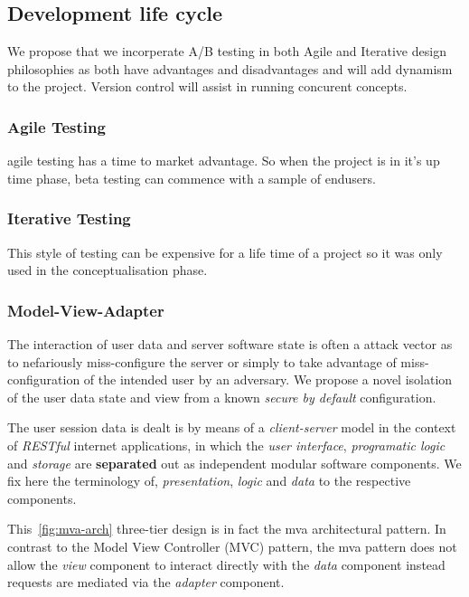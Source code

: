 \documentclass[letterpaper,twoside,12pt]{article}
\begin{document}
\subsection{Development life cycle}

We propose that we incorperate A/B testing in both Agile and Iterative design philosophies as both have advantages and disadvantages and will add dynamism to the project. Version control will assist in running concurent concepts. 

\subsubsection{Agile Testing}

\Gls{agile} testing has a time to market advantage. So when the project is in it's up time phase, beta testing can commence with a sample of endusers.

\subsubsection{Iterative Testing}

This style of testing can be expensive for a life time of a project so it was only used in the conceptualisation phase.

\subsubsection{Model-View-Adapter}

The interaction of user data and server software state is often a attack vector
as to nefariously miss-configure the server or simply to take advantage of
miss-configuration of the intended user by an adversary. We propose a novel
isolation of the user data state and view from a known \emph{secure by default}
configuration.

The user session data is dealt is by means of a \emph{client-server}
model in the context of \emph{RESTful} internet applications, in which
the \emph{user interface}, \emph{programatic logic}
and \emph{storage} are \textbf{separated} out as
independent modular software components. We fix here the terminology of,
\emph{presentation}, \emph{logic} and \emph{data} to the respective
components.



This~\cref{fig:mva-arch} three-tier design is in fact the \acrfull{mva} architectural pattern. In contrast to the Model View Controller (MVC)
pattern, the \acrshort{mva} pattern does not allow the \emph{view} component to interact
directly with the \emph{data} component instead requests are mediated via the
\emph{adapter} component.
\end{document}

